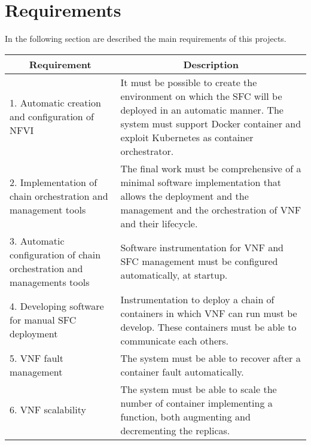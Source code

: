 \section{Requirements}\label{chap:prjan:sec:req}
In the following section are described the main requirements of this projects.

\begin{longtable}[c]{p{}p{}}
\hline
\multicolumn{1}{c}{\textbf{Requirement}}                                & \multicolumn{1}{c}{\textbf{Description}}                                                                                                                                                       \\ \hline
\endhead
%
\hline
\endfoot
%
\endlastfoot
%
1. Automatic creation and configuration of NFVI                         & It must be possible to create the environment on which the SFC will be deployed in an automatic manner. The system must support Docker container and exploit Kubernetes as container orchestrator. \\
2. Implementation of chain orchestration and management tools           & The final work must be comprehensive of a minimal software implementation that allows the deployment and the management and the orchestration of VNF and their lifecycle.                      \\
3. Automatic configuration of chain orchestration and managements tools & Software instrumentation for VNF and SFC management must be configured automatically, at startup.                                                                                              \\
4. Developing software for manual SFC deployment                        & Instrumentation to deploy a chain of containers in which VNF can run must be develop. These containers must be able to communicate each others.                                                \\
5. VNF fault management                                                 & The system must be able to recover after a container fault automatically.                                                                                                                      \\
6. VNF scalability                                                      & The system must be able to scale the number of container implementing a function, both augmenting and decrementing the replicas.                                                               \\

\end{longtable}
